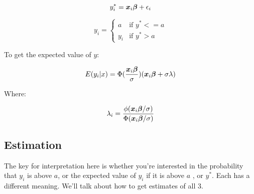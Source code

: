 \documentclass[12 pt]{article}
\begin{document}
\begin{equation}
  \label{eq:5}
 y^*_i=\boldsymbol{x}_i\boldsymbol{\beta} +\epsilon_i
\end{equation}

\begin{equation}
  \label{eq:6}
y_i= \begin{cases}a & \mbox{if } y^*<=a \\
y_i & \mbox{if } y^*>a \end{cases}
\end{equation}

To get the expected value of $y$:

\begin{equation}
  \label{eq:7}
  E(y_i|x)=\Phi(\frac{\boldsymbol{x}_i\boldsymbol{\beta}}{\sigma})(\boldsymbol{x}_i\boldsymbol{\beta} +\sigma \lambda)
\end{equation}

Where:

\begin{equation}
  \label{eq:8}
 \lambda_i=\frac{\phi(\boldsymbol{x}_i\boldsymbol{\beta}/\sigma)}{ \Phi(\boldsymbol{x}_i\boldsymbol{\beta}/\sigma)} 
\end{equation}

\subsection{Estimation}

The key for interpretation here is whether you're interested in the probability that $y_i$ is above $a$, or the expected value of $y_i$ if it is above $a$ , or $y^*$. Each has a different meaning. We'll talk about how to get estimates of all 3. 
\end{document}
